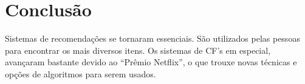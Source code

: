 \section{Conclusão}
Sistemas de recomendações se tornaram essenciais. São utilizados pelas pessoas para encontrar os mais diversos itens. Os sistemas de CF's em especial, avançaram bastante devido ao ``Prêmio Netflix'', o que trouxe novas técnicas e opções de algoritmos para serem usados.
